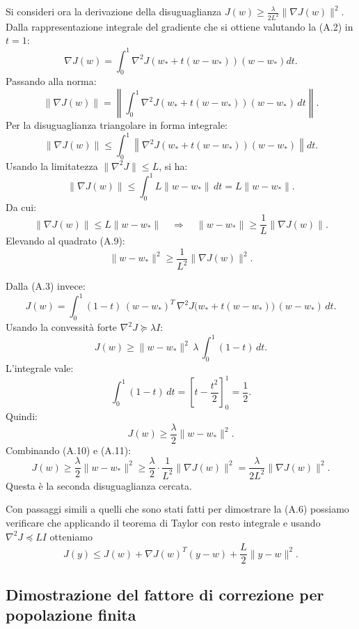 \documentclass[a4paper,12pt]{article}
\numberwithin{equation}{section}
\numberwithin{figure}{section}
\numberwithin{table}{section}
\begin{document}
Si consideri ora la derivazione della disuguaglianza $J(w) \geq \frac{\lambda}{2L^2} \|\nabla J(w)\|^2$. Dalla rappresentazione integrale del gradiente che si ottiene valutando la (A.2) in $t=1$:
\[
\nabla J(w) = \int_0^1 \nabla^2 J(w_* + t(w - w_*))(w - w_*) dt. \tag{A.7}
\]
Passando alla norma:
\[
\|\nabla J(w)\| 
= \left\| \int_0^1 \nabla^2 J(w_* + t(w - w_*))(w - w_*) \, dt \right\|.
\]
Per la disuguaglianza triangolare in forma integrale:
\[
\|\nabla J(w)\| 
\leq \int_0^1 \left\| \nabla^2 J(w_* + t(w - w_*))(w - w_*) \right\| dt.
\]
Usando la limitatezza $\|\nabla^2 J\| \leq L$, si ha:
\[
\|\nabla J(w)\| 
\leq \int_0^1 L \|w - w_*\| \, dt 
= L \|w - w_*\|. \tag{A.8}
\]
Da cui:
\[
\|\nabla J(w)\| \leq L \|w - w_*\| \quad \Longrightarrow \quad \|w - w_*\| \geq \frac{1}{L} \|\nabla J(w)\|. \tag{A.9}
\]
Elevando al quadrato (A.9):
\[
\|w - w_*\|^2 \geq \frac{1}{L^2} \|\nabla J(w)\|^2. \tag{A.10}
\]

Dalla (A.3) invece:
\[
J(w) = \int_0^1 (1-t) \, (w - w_*)^T \, \nabla^2 J\bigl(w_* + t(w - w_*)\bigr) \, (w - w_*) \, dt.
\]
Usando la convessità forte $\nabla^2 J \succeq \lambda I$:
\[
J(w) \ge \|w - w_*\|^2 \, \lambda \, \int_0^1 (1-t) \, dt.
\]
L'integrale vale:
\[
\int_0^1 (1-t) \, dt = \left[t - \frac{t^2}{2}\right]_0^1 = \frac{1}{2}.
\]
Quindi:
\[
J(w) \geq \frac{\lambda}{2} \|w - w_*\|^2. \tag{A.11}
\]
Combinando (A.10) e (A.11):
\[
J(w) \geq \frac{\lambda}{2} \|w - w_*\|^2 \geq \frac{\lambda}{2} \cdot \frac{1}{L^2} \|\nabla J(w)\|^2 = \frac{\lambda}{2L^2} \|\nabla J(w)\|^2.
\]
Questa è la seconda disuguaglianza cercata.

Con passaggi simili a quelli che sono stati fatti per dimostrare la (A.6) possiamo verificare che applicando il teorema di Taylor con resto integrale e usando \(\nabla^2 J \preceq LI\) otteniamo
\[
J(y) \le J(w) + \nabla J(w)^T(y - w) + \frac{L}{2}\|y - w\|^2. \tag{A.12}
\]

\newpage


\subsection{Dimostrazione del fattore di correzione per \newline popolazione finita}\label{app:corr}
\end{document}
